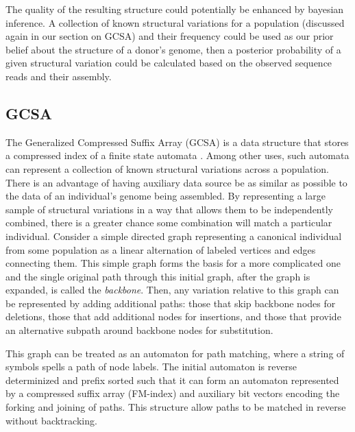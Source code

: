 The quality of the resulting structure could potentially be enhanced by bayesian inference.  A collection of known structural variations for a population (discussed again in our section on GCSA) and their frequency could be used as our prior belief about the structure of a donor's genome, then a posterior probability of a given structural variation could be calculated based on the observed sequence reads and their assembly.

\subsection{GCSA}

The Generalized Compressed Suffix Array (GCSA) is a data structure that stores a compressed index of a finite state automata \cite{siren2014indexing}.
Among other uses, such automata can represent a collection of known structural variations across a population.
There is an advantage of having auxiliary data source be as similar as possible to the data of an individual's genome being assembled.  By representing a large sample of structural variations in a way that allows them to be independently combined, there is a greater chance some combination will match a particular individual.
Consider a simple directed graph representing a canonical individual from some population as a linear alternation of labeled vertices and edges connecting them.
This simple graph forms the basis for a more complicated one and the single original path through this initial graph, after the graph is expanded, is called the \emph{backbone}.
Then, any variation relative to this graph can be represented by adding additional paths: those that skip backbone nodes for deletions, those that add additional nodes for insertions, and those that provide an alternative subpath around backbone nodes for substitution.  

This graph can be treated as an automaton for path matching, where a string of symbols spells a path of node labels.
The initial automaton is reverse determinized and prefix sorted such that it can form an automaton represented by a compressed suffix array (FM-index) and auxiliary bit vectors encoding the forking and joining of paths.  This structure allow paths to be matched in reverse without backtracking.

